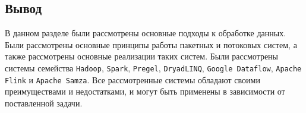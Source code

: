 \subsection*{Вывод}

В данном разделе были рассмотрены основные подходы к обработке данных. 
Были рассмотрены основные принципы работы пакетных и потоковых систем, а также рассмотрены основные реализации таких систем. 
Были рассмотрены системы семейства \texttt{Hadoop}, \texttt{Spark}, \texttt{Pregel}, \texttt{DryadLINQ}, \texttt{Google Dataflow}, \texttt{Apache Flink} и \texttt{Apache Samza}. 
Все рассмотренные системы обладают своими преимуществами и недостатками, и могут быть применены в зависимости от поставленной задачи. 

\clearpage
